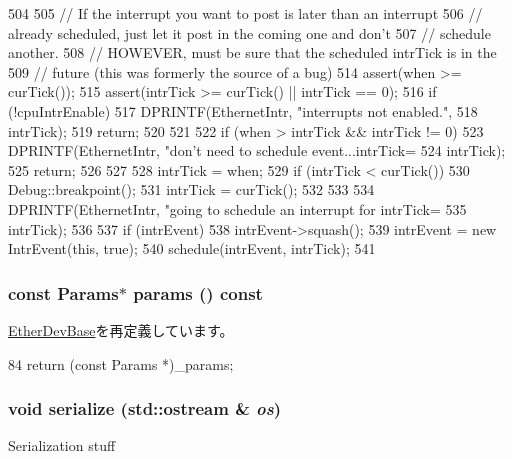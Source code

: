 \begin{DoxyCode}
504 {
505     // If the interrupt you want to post is later than an interrupt
506     // already scheduled, just let it post in the coming one and don't
507     // schedule another.
508     // HOWEVER, must be sure that the scheduled intrTick is in the
509     // future (this was formerly the source of a bug)
514     assert(when >= curTick());
515     assert(intrTick >= curTick() || intrTick == 0);
516     if (!cpuIntrEnable) {
517         DPRINTF(EthernetIntr, "interrupts not enabled.\n",
518                 intrTick);
519         return;
520     }
521 
522     if (when > intrTick && intrTick != 0) {
523         DPRINTF(EthernetIntr, "don't need to schedule event...intrTick=%
524                 intrTick);
525         return;
526     }
527 
528     intrTick = when;
529     if (intrTick < curTick()) {
530         Debug::breakpoint();
531         intrTick = curTick();
532     }
533 
534     DPRINTF(EthernetIntr, "going to schedule an interrupt for intrTick=%
535             intrTick);
536 
537     if (intrEvent)
538         intrEvent->squash();
539     intrEvent = new IntrEvent(this, true);
540     schedule(intrEvent, intrTick);
541 }
\end{DoxyCode}
\hypertarget{classSinic_1_1Base_acd3c3feb78ae7a8f88fe0f110a718dff}{
\subsubsection[{params}]{\setlength{\rightskip}{0pt plus 5cm}const {\bf Params}$\ast$ params () const}}
\label{classSinic_1_1Base_acd3c3feb78ae7a8f88fe0f110a718dff}


\hyperlink{classEtherDevBase_a24c177ef5d1124c3ff3e68a7e53532cf}{EtherDevBase}を再定義しています。


\begin{DoxyCode}
84 { return (const Params *)_params; }
\end{DoxyCode}
\hypertarget{classSinic_1_1Base_a53e036786d17361be4c7320d39c99b84}{
\subsubsection[{serialize}]{\setlength{\rightskip}{0pt plus 5cm}void serialize (std::ostream \& {\em os})}}
\label{classSinic_1_1Base_a53e036786d17361be4c7320d39c99b84}
Serialization stuff 

